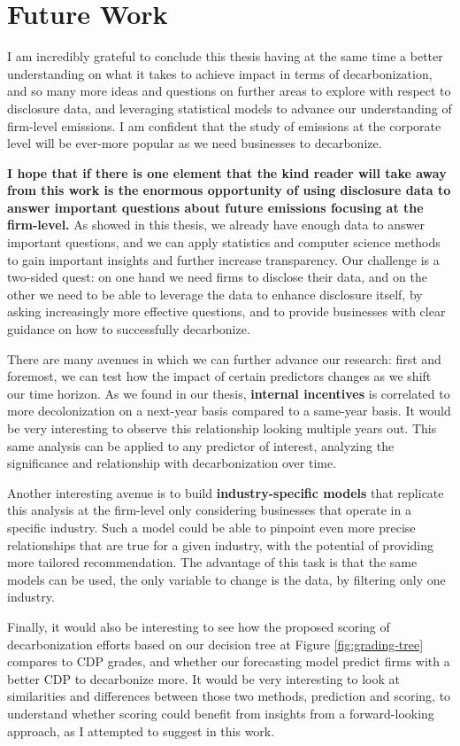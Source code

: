 \section{Future Work}
I am incredibly grateful to conclude this thesis having at the same time a better understanding on what it takes to achieve impact in terms of decarbonization, and so many more ideas and questions on further areas to explore with respect to disclosure data, and leveraging statistical models to advance our understanding of firm-level emissions. I am confident that the study of emissions at the corporate level will be ever-more popular as we need businesses to decarbonize. 

\textbf{I hope that if there is one element that the kind reader will take away from this work is the enormous opportunity of using disclosure data to answer important questions about future emissions focusing at the firm-level.} As showed in this thesis, we already have enough data to answer important questions, and we can apply statistics and computer science methods to gain important insights and further increase transparency. Our challenge is a two-sided quest: on one hand we need firms to disclose their data, and on the other we need to be able to leverage the data to enhance disclosure itself, by asking increasingly more effective questions, and to provide businesses with clear guidance on how to successfully decarbonize. 

There are many avenues in which we can further advance our research: first and foremost, we can test how the impact of certain predictors changes as we shift our time horizon. As we found in our thesis, \textbf{internal incentives} is correlated to more decolonization on a next-year basis compared to a same-year basis. It would be very interesting to observe this relationship looking multiple years out. This same analysis can be applied to any predictor of interest, analyzing the significance and relationship with decarbonization over time. 

Another interesting avenue is to build \textbf{industry-specific models} that replicate this analysis at the firm-level only considering businesses that operate in a specific industry. Such a model could be able to pinpoint even more precise relationships that are true for a given industry, with the potential of providing more tailored recommendation. The advantage of this task is that the same models can be used, the only variable to change is the data, by filtering only one industry. 

Finally, it would also be interesting to see how the proposed scoring of decarbonization efforts based on our decision tree at Figure \ref{fig:grading-tree} compares to CDP grades, and whether our forecasting model predict firms with a better CDP to decarbonize more. It would be very interesting to look at similarities and differences between those two methods, prediction and scoring, to understand whether scoring could benefit from insights from a forward-looking approach, as I attempted to suggest in this work.